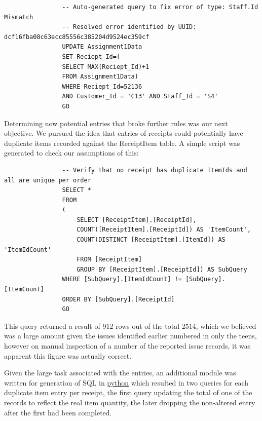 \documentclass{article}
\begin{document}
            \begin{lstlisting}
                -- Auto-generated query to fix error of type: Staff.Id Mismatch
                -- Resolved error identified by UUID: dcf16fba08c63ecc85556c385204d9524ec359cf
                UPDATE Assignment1Data 
                SET Reciept_Id=(
                SELECT MAX(Reciept_Id)+1 
                FROM Assignment1Data)
                WHERE Reciept_Id=52136
                AND Customer_Id = 'C13' AND Staff_Id = 'S4'
                GO
            \end{lstlisting}

            Determining now potential entries that broke further rules was our next objective.
            We pursued the idea that entries of receipts could potentially have duplicate items
            recorded against the ReceiptItem table. A simple script was generated to check our 
            assumptions of this:

            \begin{lstlisting}
                -- Verify that no receipt has duplicate ItemIds and all are unique per order
                SELECT *
                FROM
                (
                    SELECT [ReceiptItem].[ReceiptId], 
                    COUNT([ReceiptItem].[ReceiptId]) AS 'ItemCount',
                    COUNT(DISTINCT [ReceiptItem].[ItemId]) AS 'ItemIdCount'
                    FROM [ReceiptItem]
                    GROUP BY [ReceiptItem].[ReceiptId]) AS SubQuery 
                WHERE [SubQuery].[ItemIdCount] != [SubQuery].[ItemCount]
                ORDER BY [SubQuery].[ReceiptId]
                GO
            \end{lstlisting}

            This query returned a result of 912 rows out of the total 2514, which we believed 
            was a large amount given the issues identified earlier numbered in only the teens, 
            however on manual inspection of a number of the reported issue records, it was 
            apparent this figure was actually correct. 
            \par
            Given the large task associated with the entries, an additional module was
            written for generation of SQL in \hyperref[sec:Python]{\color{blue}python} which resulted in two queries for each
            duplicate item entry per receipt, the first query updating the total of one of the 
            records to reflect the real item quantity, the later dropping the non-altered 
            entry after the first had been completed.
\end{document}
